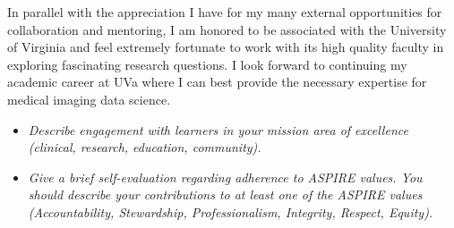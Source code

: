 \documentclass[
  11pt,
]{article}
\begin{document}
In parallel with the appreciation I have for my many external
opportunities for collaboration and mentoring, I am honored to be
associated with the University of Virginia and feel extremely fortunate
to work with its high quality faculty in exploring fascinating research
questions. I look forward to continuing my academic career at UVa where
I can best provide the necessary expertise for medical imaging data
science.

\begin{itemize}
\item
  \emph{Describe engagement with learners in your mission area of
  excellence (clinical, research, education, community).}
\item
  \emph{Give a brief self-evaluation regarding adherence to ASPIRE
  values. You should describe your contributions to at least one of the
  ASPIRE values (Accountability, Stewardship, Professionalism,
  Integrity, Respect, Equity).}
\end{itemize}
\end{document}
